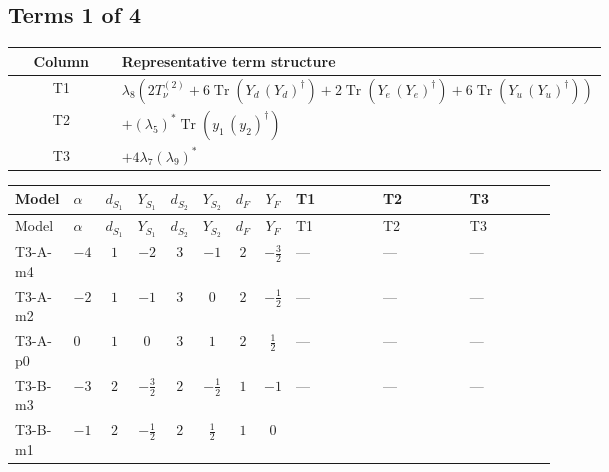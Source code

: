 \documentclass[8pt]{article}
\begin{document}
\begin{landscape}
\subsection*{Terms 1 of 4}
\begin{center}
\begin{tabular}{@{}c >{\raggedright\arraybackslash}p{0.82\linewidth}@{}}
\toprule
Column & Representative term structure \\
\midrule
T1 & \(\displaystyle {\lambda_{8}} (2 T_{\nu}^{(2)}+6 \operatorname{Tr}\!\left({Y_d}\,\left({Y_d}\right)^{\dagger}\right)+2 \operatorname{Tr}\!\left({Y_e}\,\left({Y_e}\right)^{\dagger}\right)+6 \operatorname{Tr}\!\left({Y_u}\,\left({Y_u}\right)^{\dagger}\right))\) \\
\midrule
T2 & \(\displaystyle +\left({\lambda_5}\right)^{*} \operatorname{Tr}\!\left({y_1}\,\left({y_2}\right)^{\dagger}\right)\) \\
\midrule
T3 & \(\displaystyle +4 {\lambda_{7}} \left({\lambda_{9}}\right)^{*}\) \\
\midrule
\bottomrule
\end{tabular}
\end{center}
\smallskip
\tiny
\begin{longtable}{@{}llcccccc >{\raggedright\arraybackslash}p{0.21\linewidth} >{\raggedright\arraybackslash}p{0.21\linewidth} >{\raggedright\arraybackslash}p{0.21\linewidth}@{}}
\toprule
Model & $\alpha$ & $d_{S_1}$ & $Y_{S_1}$ & $d_{S_2}$ & $Y_{S_2}$ & $d_F$ & $Y_F$ & T1 & T2 & T3 \\
\midrule
\endfirsthead
\toprule
Model & $\alpha$ & $d_{S_1}$ & $Y_{S_1}$ & $d_{S_2}$ & $Y_{S_2}$ & $d_F$ & $Y_F$ & T1 & T2 & T3 \\
\midrule
\endhead
T3-A-m4 & $-4$ & $1$ & $-2$ & $3$ & $-1$ & $2$ & $-\frac{3}{2}$ & --- & --- & --- \\
\midrule
T3-A-m2 & $-2$ & $1$ & $-1$ & $3$ & $0$ & $2$ & $-\frac{1}{2}$ & --- & --- & --- \\
\midrule
T3-A-p0 & $0$ & $1$ & $0$ & $3$ & $1$ & $2$ & $\frac{1}{2}$ & --- & --- & --- \\
\midrule
T3-B-m3 & $-3$ & $2$ & $-\frac{3}{2}$ & $2$ & $-\frac{1}{2}$ & $1$ & $-1$ & --- & --- & --- \\
\midrule
T3-B-m1 & $-1$ & $2$ & $-\frac{1}{2}$ & $2$ & $\frac{1}{2}$ & $1$ & $0$ & \scriptsize\adjustbox{max width=\linewidth}{$\begin{gathered} {\lambda_{8}} (2 T_{\nu}^{(2)}+6 \operatorname{Tr}\!\left({Y_d}\,\left({Y_d}\right)^{\dagger}\right)+2 \operatorname{Tr}\!\left({Y_e}\,\left({Y_e}\right)^{\dagger}\right)+6 \operatorname{Tr}\!\left({Y_u}\,\left({Y_u}\right)^{\dagger}\right))\end{gathered}$} & \scriptsize\adjustbox{max width=\linewidth}{$\begin{gathered} +\left({\lambda_5}\right)^{*} \operatorname{Tr}\!\left({y_1}\,\left({y_2}\right)^{\dagger}\right)\end{gathered}$} & \scriptsize\adjustbox{max width=\linewidth}{$\begin{gathered} +4 {\lambda_{7}} \left({\lambda_{9}}\right)^{*}\end{gathered}$} \\

\end{longtable}
\end{landscape}
\end{document}

